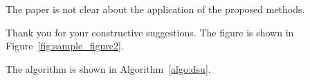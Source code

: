 \begin{revcomment}
The paper is not clear about the application of the proposed methods.
\end{revcomment}
\begin{revresponse}[]
    Thank you for your constructive suggestions. \lipsum[6] \cite{tomsett2020rapid,liu2019large,qi2023text} The figure is shown in Figure~\ref{fig:sample_figure2}.
    

    \lipsum[7] \cite{zhang2023deep,fu2022long} The algorithm is shown in Algorithm~\ref{algo:dsu}.
    

\end{revresponse}

\clearpage
\printbibliography[heading=bibintoc, heading=bibliography, title={References}, section=\therefsection]